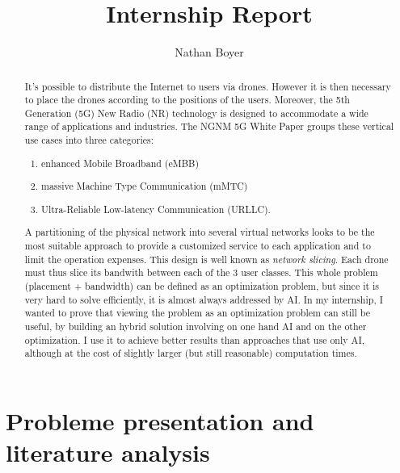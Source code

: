 \documentclass[letterpaper]{article}
\title{Internship Report}
\author{Nathan Boyer}
\begin{document}
\maketitle

\begin{abstract}

    It's possible to distribute the Internet to users via drones.
    However it is then necessary to place the drones according to the positions of the users.
    Moreover, the 5th Generation (5G) New Radio (NR) technology is designed to accommodate a wide range of applications and industries. The NGNM 5G White Paper \cite{5gwhitepaper} groups these vertical use cases into three categories:
    \begin{enumerate}
        \item enhanced Mobile Broadband (eMBB)
        \item massive Machine Type Communication (mMTC)
        \item Ultra-Reliable Low-latency Communication (URLLC).
    \end{enumerate}

    A partitioning of the physical network into several virtual networks looks to be the most suitable approach to provide a customized service to each application and to limit the operation expenses. This design is well known as \textit{network slicing}.
    Each drone must thus slice its bandwith between each of the 3 user classes.
    This whole problem (placement + bandwidth) can be defined as an optimization problem, but since it is very hard to solve efficiently, it is almost always addressed by AI.
    In my internship, I wanted to prove that viewing the problem as an optimization problem can still be useful, by building an hybrid solution involving on one hand AI and on the other optimization.
    I use it to achieve better results than approaches that use only AI, although at the cost of slightly larger (but still reasonable) computation times.
\end{abstract}


\section{Probleme presentation and literature analysis}
\end{document}
